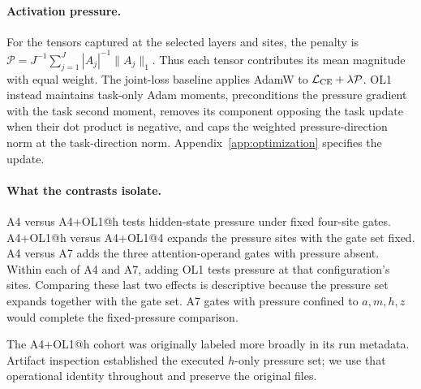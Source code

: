 \paragraph{Activation pressure.}
For the tensors captured at the selected layers and sites, the penalty is
$\mathcal{P}=J^{-1}\sum_{j=1}^{J}|A_j|^{-1}\|A_j\|_1$.
Thus each tensor contributes its mean magnitude with equal weight.
The joint-loss baseline applies AdamW to
$\mathcal{L}_{\rm CE}+\lambda\mathcal{P}$. OL1 instead maintains task-only
Adam moments, preconditions the pressure gradient with the task second moment,
removes its component opposing the task update when their dot product is
negative, and caps the weighted pressure-direction norm at the task-direction
norm. Appendix~\ref{app:optimization} specifies the update.

\paragraph{What the contrasts isolate.}
A4 versus A4+OL1@h tests hidden-state pressure under fixed four-site gates.
A4+OL1@h versus A4+OL1@4 expands the pressure sites with the gate set fixed.
A4 versus A7 adds the three attention-operand gates with pressure absent.
Within each of A4 and A7, adding OL1 tests pressure at that configuration's
sites. Comparing these last two effects is descriptive because the pressure
set expands together with the gate set. A7 gates with pressure confined to
$a,m,h,z$ would complete the fixed-pressure comparison.

The A4+OL1@h cohort was originally labeled more broadly in its run metadata.
Artifact inspection established the executed $h$-only pressure set; we use that
operational identity throughout and preserve the original files.
